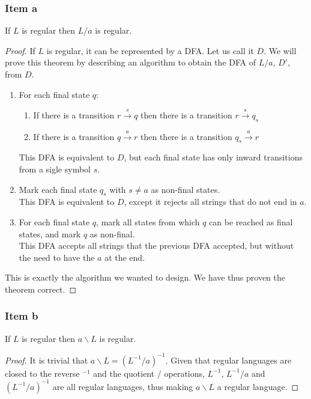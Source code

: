 {\subsubsection{Item a}
\begin{theorem}
If $L$ is regular then $L/a$ is regular.
\end{theorem}
\begin{proof}
If $L$ is regular, it can be represented by a DFA. Let us call it $D$. We will prove this theorem by describing an algorithm to obtain the DFA of $L/a$, $D'$, from $D$.
\begin{enumerate}
	\item For each final state $q$:
	\begin{enumerate}
		\item If there is a transition $r \xrightarrow{s} q$ then there is a transition $r \xrightarrow{s} q_s$
		\item If there is a transition $q \xrightarrow{a} r$ then there is a transition $q_s \xrightarrow{a} r$ 
	\end{enumerate}
	This DFA is equivalent to $D$, but each final state has only inward transitions from a sigle symbol $s$.
	\item Mark each final state $q_s$ with $s \neq a$ as non-final states.\\
	This DFA is equivalent to $D$, except it rejects all strings that do not end in $a$.
	\item For each final state $q$, mark all states from which $q$ can be reached as final states, and mark $q$ as non-final.\\
	This DFA accepts all strings that the previous DFA accepted, but without the need to have the $a$ at the end.
\end{enumerate}
This is exactly the algorithm we wanted to design. We have thus proven the theorem correct.
\end{proof}
\subsubsection{Item b}
\begin{theorem}
If $L$ is regular then $a\backslash L$ is regular.
\end{theorem}
\begin{proof}
It is trivial that $a \backslash L=(L^{-1}/a)^{-1}$. Given that regular languages are closed to the reverse $^{-1}$ and the quotient $/$ operations, $L^{-1}$, $L^{-1}/a$ and $(L^{-1}/a)^{-1}$ are all regular languages, thus making $a \backslash L$ a regular language.
\end{proof}
}
